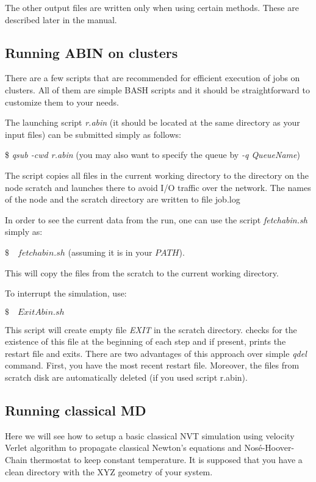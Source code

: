 The other output files are written only when using certain methods. These are described later in the manual.

\subsection{Running ABIN on clusters}
\label{sec:clusters}
There are a few scripts that are recommended for efficient execution of \abin jobs on clusters. All of them are simple BASH scripts and it should be straightforward to customize them to your needs.

The launching script \textit{r.abin} (it should be located at the same directory as your input files) can be submitted simply as follows:

\bigskip 
\colorbox{black!20}{\$  \textit{qsub -cwd r.abin}} (you may also want to specify the queue by \textit{-q QueueName})

\bigskip \noindent 
The script copies all files in the current working directory to the directory on the node scratch and launches \abin there to avoid I/O traffic over the network.
The names of the node and the scratch directory are written to file job.log

In order to see the current data from the run, one can use the script \textit{fetchabin.sh} simply as:

\bigskip
\colorbox{black!20}{$ \$ \quad fetchabin.sh $} (assuming it is in your $PATH$).

\bigskip \noindent 
This will copy the files from the scratch to the current working directory.  

\noindent
To interrupt the simulation, use:

\colorbox{black!20}{$ \$ \quad ExitAbin.sh $}

\bigskip \noindent 
This script will create empty file \textit{EXIT} in the scratch directory. \abin checks for the existence of this file at the beginning of each step and if present, prints the restart file and exits. There are two advantages of this approach over simple \textit{qdel} command. First, you have the most recent restart file. Moreover, the files from scratch disk are automatically deleted (if you used script r.abin).

\subsection{Running classical MD}

Here we will see how to setup a basic classical NVT simulation using velocity Verlet algorithm to propagate classical Newton's equations and Nos\'{e}-Hoover-Chain thermostat to keep constant temperature. 
It is supposed that you have a clean directory with the XYZ geometry of your system.

